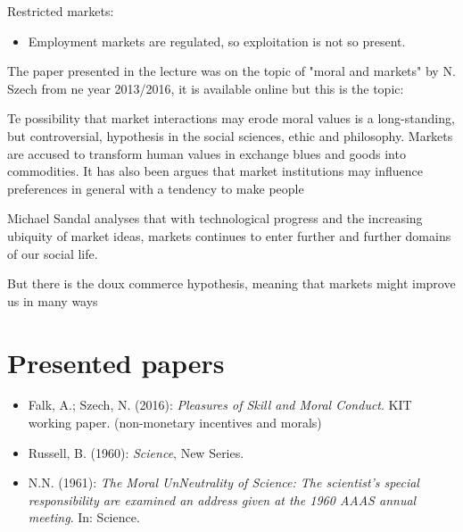 Restricted markets:

\begin{itemize}
	\item Employment markets are regulated, so exploitation is not so present.
\end{itemize}



The paper presented in the lecture was on the topic of "moral and markets" by N. Szech from ne year 2013/2016, it is available online but this is the topic:


Te possibility that market interactions may erode moral values is a long-standing, but controversial, hypothesis in the social sciences, ethic and philosophy. Markets are accused to transform human values in exchange blues and goods into commodities. It has also been argues that market institutions may influence preferences in general with a tendency to make people

Michael Sandal analyses that with technological progress and the increasing ubiquity of market ideas, markets continues to enter further and further domains of our social life.



But there is the doux commerce hypothesis, meaning that markets might improve us in many ways


\section{Presented papers}

\begin{itemize}
	\item Falk, A.; Szech, N. (2016): \textit{Pleasures of Skill and Moral Conduct}. KIT working paper. (non-monetary incentives and morals)
	\item Russell, B. (1960): \textit{Science}, New Series.
	\item N.N. (1961): \textit{The Moral UnNeutrality of Science: The scientist's special responsibility are examined an address given at the 1960 AAAS annual meeting}. In: Science.
\end{itemize}


\newpage